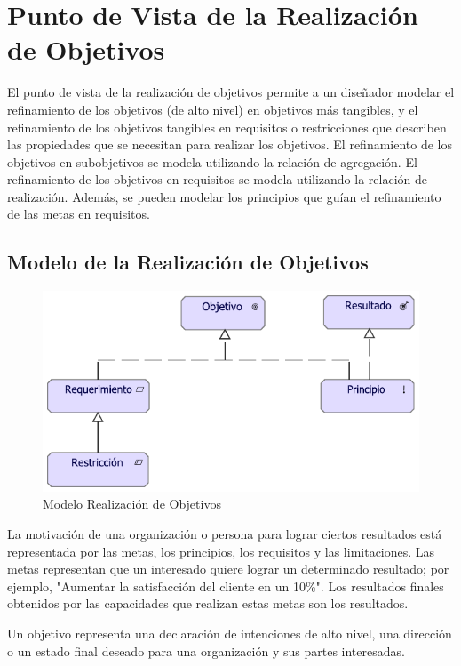 \section{Punto de Vista de la Realización de Objetivos}

El punto de vista de la realización de objetivos permite a un diseñador modelar el refinamiento de los objetivos (de alto nivel) en objetivos más tangibles, y el refinamiento de los objetivos tangibles en requisitos o restricciones que describen las propiedades que se necesitan para realizar los objetivos. El refinamiento de los objetivos en subobjetivos se modela utilizando la relación de agregación. El refinamiento de los objetivos en requisitos se modela utilizando la relación de realización.
Además, se pueden modelar los principios que guían el refinamiento de las metas en requisitos.

\subsection{Modelo de la Realización de Objetivos}
\begin{figure}[h!]
	\centering
	\includegraphics[width=1.0\linewidth]{imgs/modelo/RealObjetivos.pdf}
	\caption{Modelo Realización de Objetivos}
\end{figure}

La motivación de una organización o persona para lograr ciertos resultados está representada por las metas, los principios, los requisitos y las limitaciones. Las metas representan que un interesado quiere lograr un determinado resultado; por ejemplo, "Aumentar la satisfacción del cliente en un 10\%". Los resultados finales obtenidos por las capacidades que realizan estas metas son los resultados.

Un objetivo representa una declaración de intenciones de alto nivel, una dirección o un estado final deseado para una organización y sus partes interesadas.

